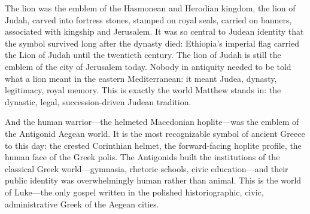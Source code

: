 The lion was the emblem of the Hasmonean and Herodian kingdom, the lion of Judah, carved into fortress stones, stamped on royal seals, carried on banners, associated with kingship and Jerusalem.
It was so central to Judean identity that the symbol survived long after the dynasty died: Ethiopia's imperial flag carried the Lion of Judah until the twentieth century.
The lion of Judah is still the emblem of the city of Jerusalem today.
Nobody in antiquity needed to be told what a lion meant in the eastern Mediterranean: it meant Judea, dynasty, legitimacy, royal memory.
This is exactly the world Matthew stands in: the dynastic, legal, succession-driven Judean tradition.

And the human warrior---the helmeted Macedonian hoplite---was the emblem of the Antigonid Aegean world.
It is the most recognizable symbol of ancient Greece to this day: the crested Corinthian helmet, the forward-facing hoplite profile, the human face of the Greek polis.
The Antigonids built the institutions of the classical Greek world---gymnasia, rhetoric schools, civic education---and their public identity was overwhelmingly human rather than animal.
This is the world of Luke---the only gospel written in the polished historiographic, civic, administrative Greek of the Aegean cities.

